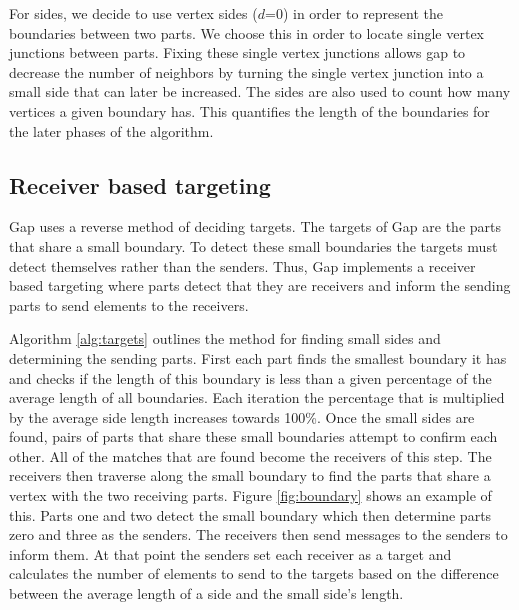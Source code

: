\documentclass{thesis}
\begin{document}
For sides, we decide to use vertex sides ($d$=0) in order to represent the 
boundaries between two parts. We choose this in order to locate single vertex 
junctions between parts. Fixing these single vertex junctions allows gap to 
decrease the number of neighbors by turning the single vertex junction into 
a small side that can later be increased. The sides are also used to count how 
many vertices a given boundary has. This quantifies the length of the 
boundaries for the later phases of the algorithm.

\subsection{Receiver based targeting}

Gap uses a reverse method of deciding targets. The targets of Gap are the 
parts that share a small boundary. To detect these small boundaries the 
targets must detect themselves rather than the senders. Thus, Gap 
implements a receiver based targeting where parts detect that they are 
receivers and inform the sending parts to send elements to the receivers. 

Algorithm \ref{alg:targets} outlines the method for finding small sides 
and determining the sending parts. First each part finds the smallest 
boundary it has and checks if the length of this boundary is less than 
a given percentage of the average length of all boundaries. Each iteration 
the percentage that is multiplied by the average side length increases 
towards 100\%. Once the small sides are found, pairs of parts that share 
these small boundaries attempt to confirm each other. All of the matches 
that are found become the receivers of this step. The receivers then 
traverse along the small boundary to find the parts that share a vertex 
with the two receiving parts. Figure \ref{fig:boundary} shows an example 
of this. Parts one and two detect the small boundary which then determine 
parts zero and three as the senders. The receivers then send messages to the 
senders to inform them. At that point the senders set each receiver as a 
target and calculates the number of elements to send to the targets 
based on the difference between the average length of a side and the 
small side's length.
\end{document}
